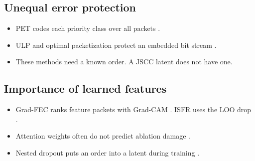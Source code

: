 \documentclass[journal]{IEEEtran}
\begin{document}
\subsection{Unequal error protection}
\begin{itemize}
\item PET codes each priority class over all packets \cite{albanese1996pet}.
\item ULP and optimal packetization protect an embedded bit stream \cite{mohr2000ulp,dumitrescu2004optimal,hamzaoui2005optimized}.
\item These methods need a known order. A JSCC latent does not have one.
\end{itemize}
\subsection{Importance of learned features}
\begin{itemize}
\item Grad-FEC ranks feature packets with Grad-CAM \cite{uyanik2023gradfec}. ISFR uses the LOO drop \cite{zhan2026isfr}.
\item Attention weights often do not predict ablation damage \cite{jain2019attention,morcos2018single}.
\item Nested dropout puts an order into a latent during training \cite{rippel2014nested}.
\end{itemize}

\end{document}
